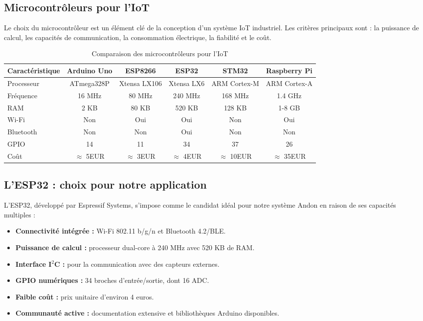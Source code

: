 \subsection{Microcontr\^oleurs pour l'IoT}

Le choix du microcontr\^oleur est un \'el\'ement cl\'e de la conception d'un syst\`eme IoT industriel. Les crit\`eres principaux sont : la puissance de calcul, les capacit\'es de communication, la consommation \'electrique, la fiabilit\'e et le co\^ut.

\begin{table}[htbp]
\centering
\renewcommand{\arraystretch}{1.3}
\begin{tabular}{l c c c c c}
\toprule
\textbf{Caract\'eristique} & \textbf{Arduino Uno} & \textbf{ESP8266} & \textbf{ESP32} & \textbf{STM32} & \textbf{Raspberry Pi} \\
\midrule
Processeur & ATmega328P & Xtensa LX106 & Xtensa LX6 & ARM Cortex-M & ARM Cortex-A \\
Fr\'equence & 16 MHz & 80 MHz & 240 MHz & 168 MHz & 1.4 GHz \\
RAM & 2 KB & 80 KB & 520 KB & 128 KB & 1-8 GB \\
Wi-Fi & Non & Oui & Oui & Non & Oui \\
Bluetooth & Non & Non & Oui & Non & Non \\
GPIO & 14 & 11 & 34 & 37 & 26 \\
Co\^ut & $\approx$ 5EUR & $\approx$ 3EUR & $\approx$ 4EUR & $\approx$ 10EUR & $\approx$ 35EUR \\
\bottomrule
\end{tabular}
\caption{Comparaison des microcontr\^oleurs pour l'IoT}
\label{tab:microcontrollers}
\end{table}

\subsection{L'ESP32 : choix pour notre application}

L'ESP32, d\'evelopp\'e par Espressif Systems, s'impose comme le candidat id\'eal pour notre syst\`eme Andon en raison de ses capacit\'es multiples :

\begin{itemize}
    \item \textbf{Connectivit\'e int\'egr\'ee :} Wi-Fi 802.11 b/g/n et Bluetooth 4.2/BLE.
    \item \textbf{Puissance de calcul :} processeur dual-core \`a 240 MHz avec 520 KB de RAM.
    \item \textbf{Interface I$^2$C :} pour la communication avec des capteurs externes.
    \item \textbf{GPIO num\'eriques :} 34 broches d'entr\'ee/sortie, dont 16 ADC.
    \item \textbf{Faible co\^ut :} prix unitaire d'environ 4 euros.
    \item \textbf{Communaut\'e active :} documentation extensive et biblioth\`eques Arduino disponibles.
\end{itemize}

